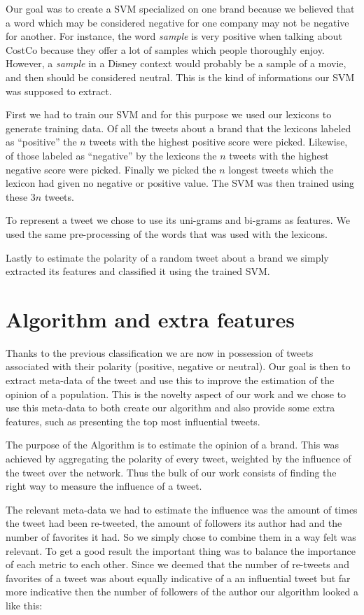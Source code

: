 \documentclass[a4paper,12pt]{report}
\begin{document}
Our goal was to create a SVM specialized on one brand because we believed that a word which may be considered negative for one company may not be negative for another.
For instance, the word \textit{sample} is very positive when talking about CostCo because they offer a lot of samples which people thoroughly enjoy. However, a \textit{sample} in a Disney context would probably be a sample of a movie, and then should be considered neutral.
This is the kind of informations our SVM was supposed to extract.

First we had to train our SVM and for this purpose we used our lexicons to generate training data. Of all the tweets about a brand that the lexicons labeled as ``positive'' the $n$ tweets with the highest positive score were picked. Likewise, of those labeled as ``negative'' by the lexicons the $n$ tweets with the highest negative score were picked. Finally we picked the $n$ longest tweets which the lexicon had given no negative or positive value. The SVM was then trained using these $3n$ tweets.

To represent a tweet we chose to use its uni-grams and bi-grams as features. We used the same pre-processing of the words that was used with the lexicons.

Lastly to estimate the polarity of a random tweet about a brand we simply extracted its features and classified it using the trained SVM.

\section{Algorithm and extra features}

Thanks to the previous classification we are now in possession of tweets associated with their polarity (positive, negative or neutral). Our goal is then to extract meta-data of the tweet and use this to improve the estimation of the opinion of a population.
This is the novelty aspect of our work and we chose to use this meta-data to both create our algorithm and also provide some extra features, such as presenting the top most influential tweets.

The purpose of the Algorithm is to estimate the opinion of a brand. 
This was achieved by aggregating the polarity of every tweet, weighted by the influence of the tweet over the network.
Thus the bulk of our work consists of finding the right way to measure the influence of a tweet.

The relevant meta-data we had to estimate the influence was the amount of times the tweet had been re-tweeted, the amount of followers its author had and the number of favorites it had. So we simply chose to combine them in a way felt was relevant. To get a good result the important thing was to balance the importance of each metric to each other. Since we deemed that the number of re-tweets and favorites of a tweet was about equally indicative of a an influential tweet but far more indicative then the number of followers of the author our algorithm looked a like this:
\end{document}
